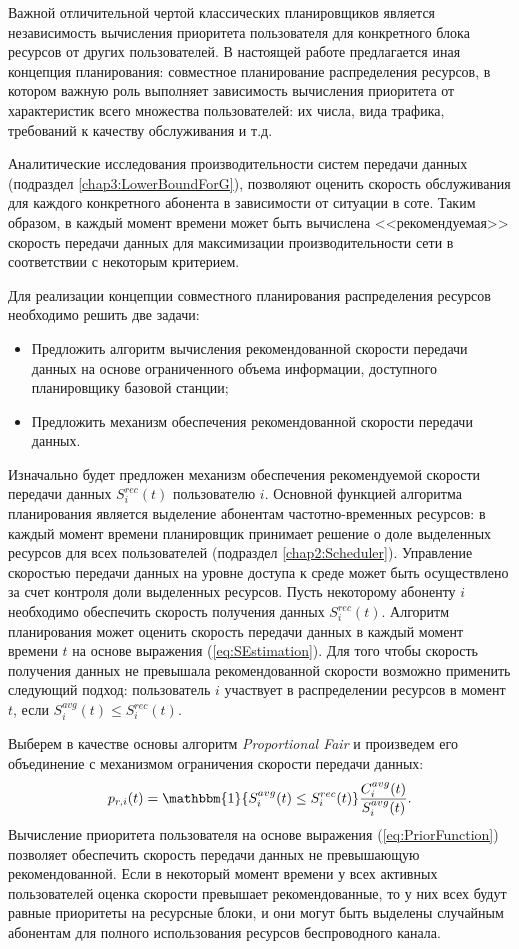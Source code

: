 Важной отличительной чертой классических планировщиков является независимость вычисления приоритета пользователя для конкретного блока ресурсов от других пользователей. В настоящей работе предлагается иная концепция планирования: совместное планирование распределения ресурсов, в котором важную роль выполняет зависимость вычисления приоритета от характеристик всего множества пользователей: их числа, вида трафика, требований к качеству обслуживания и т.д.

Аналитические исследования производительности систем передачи данных (подраздел \ref{chap3:LowerBoundForG}), позволяют оценить скорость обслуживания для каждого конкретного абонента в зависимости от ситуации в соте. Таким образом, в каждый момент времени может быть вычислена <<рекомендуемая>> скорость передачи данных для максимизации производительности сети в соответствии с некоторым критерием.

Для реализации концепции совместного планирования распределения ресурсов необходимо решить две задачи:
\begin{itemize}
	\item Предложить алгоритм вычисления рекомендованной скорости передачи данных на основе ограниченного объема информации, доступного планировщику базовой станции;
	\item Предложить механизм обеспечения рекомендованной скорости передачи данных.
\end{itemize}

Изначально будет предложен механизм обеспечения рекомендуемой скорости передачи данных $S^{rec}_i(t)$ пользователю $i$. Основной функцией алгоритма планирования является выделение абонентам частотно-временных ресурсов: в каждый момент времени планировщик принимает решение о доле выделенных ресурсов для всех пользователей (подраздел \ref{chap2:Scheduler}). Управление скоростью передачи данных на уровне доступа к среде может быть осуществлено за счет контроля доли выделенных ресурсов. Пусть некоторому абоненту $i$ необходимо обеспечить скорость получения данных $S^{rec}_i(t)$. Алгоритм планирования может оценить скорость передачи данных в каждый момент времени $t$ на основе выражения (\ref{eq:SEstimation}). Для того чтобы скорость получения данных не превышала рекомендованной скорости возможно применить следующий подход: пользователь $i$ участвует в распределении ресурсов в момент $t$, если $S_i^{avg}(t) \leq S^{rec}_i(t).$

Выберем в качестве основы алгоритм \textit{Proportional Fair} и произведем его объединение с механизмом ограничения скорости передачи данных:
\begin{equation}
\label{eq:PriorFunction}
p_{r,i}(t) = \mathbbm{1}\{S_i^{avg}(t) \leq S^{rec}_i(t)\}\frac{C_i^{avg}(t)}{S_i^{avg}(t)}.
\end{equation}
Вычисление приоритета пользователя на основе выражения (\ref{eq:PriorFunction}) позволяет обеспечить скорость передачи данных не превышающую рекомендованной. Если в некоторый момент времени у всех активных пользователей оценка скорости превышает рекомендованные, то у них всех будут равные приоритеты на ресурсные блоки, и они могут быть выделены случайным абонентам для полного использования ресурсов беспроводного канала.

